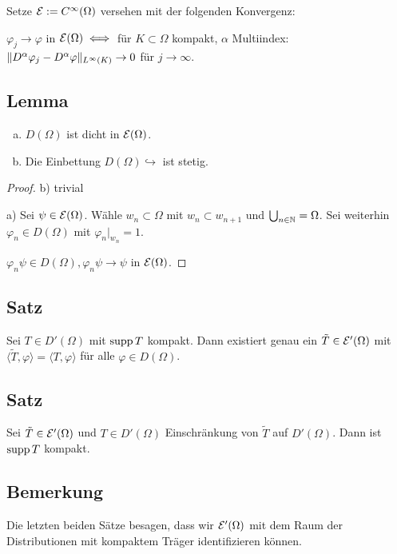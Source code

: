 Setze $\mathcal{E} := C^\infty(\Omega)$ versehen mit der folgenden Konvergenz:

$\varphi_j \to \varphi $ in $ \mathcal{E}(\Omega) \iff $ für $K \subset \Omega$ kompakt, $\alpha$ Multiindex: $\lVert D^\alpha \varphi_j - D^\alpha \varphi \rVert_{L^\infty(K)} \to 0$ für $j \to \infty$.

\subsection{Lemma}

\begin{enumerate}[a)]
  \item $D(\Omega)$ ist dicht in $\mathcal{E}(\Omega)$.
  \item Die Einbettung $D(\Omega) \hookrightarrow$ ist stetig.
\end{enumerate}

\begin{proof}
  b) trivial

  a) Sei $\psi \in \mathcal{E}(\Omega)$. 
  Wähle $w_n \subset \Omega$ mit $w_n \subset w_{n+1}$ und $\bigcup_{n \in \mathbb{N}} = \Omega$.
  Sei weiterhin $\varphi_n \in D(\Omega)$ mit $\varphi_n|_{w_n} = 1$.

  $\varphi_n \psi \in D(\Omega), \varphi_n \psi \to \psi$ in $\mathcal{E}(\Omega)$.
\end{proof}

\subsection{Satz}

Sei $T \in D'(\Omega)$ mit $\operatorname{supp} T$ kompakt.
Dann existiert genau ein $\tilde T \in \mathcal{E}'(\Omega)$ mit $\langle \tilde T, \varphi \rangle = \langle T , \varphi \rangle$ für alle $\varphi \in D(\Omega)$.

\subsection{Satz}

Sei $\tilde T \in \mathcal{E}'(\Omega)$ und $T \in D'(\Omega)$ Einschränkung von $\tilde T$ auf $D'(\Omega)$.
Dann ist $\operatorname{supp} T$ kompakt.

\subsection{Bemerkung}
Die letzten beiden Sätze besagen, dass wir $\mathcal{E}'(\Omega)$ mit dem Raum der Distributionen mit kompaktem Träger identifizieren können.
